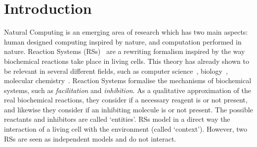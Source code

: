 
\section{Introduction}

Natural Computing is an emerging area of research which has two main 
aspects: human designed computing inspired by nature, and computation 
performed in nature. Reaction Systems (RSs)~\cite{BEMR11} are a 
rewriting formalism
inspired by the way biochemical reactions take place in living 
cells.  
This theory has already shown to be relevant in several different 
fields, such as computer science~\cite{MPR15}, 
biology~\cite{ABP14,CMMBM12,Az17,BarbutiGLM16}, 
molecular chemistry~\cite{OY16}.
Reaction Systems formalise the mechanisms of biochemical systems, 
such as {\em facilitation} and {\em inhibition}. 
As a qualitative approximation of the real biochemical reactions, they
consider if a necessary reagent is or not present, and likewise they
consider if an inhibiting molecule is or not present. 
The  possible reactants and inhibitors are called `entities'.
RSs model in a direct way the interaction of a living cell
with the environment (called `context'). However, two RSs are seen
as independent models and do not interact.


